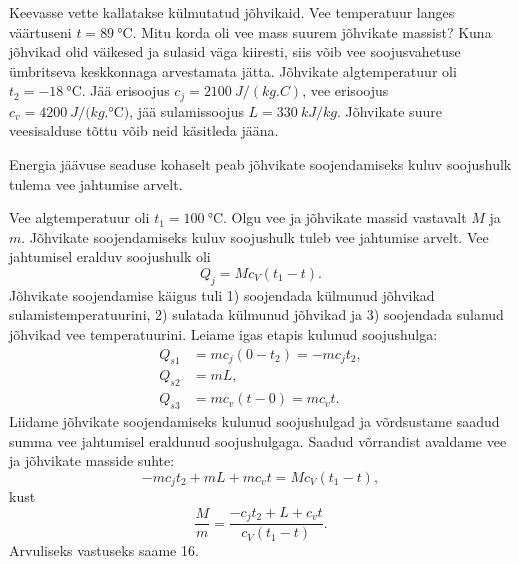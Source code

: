 
Keevasse vette kallatakse külmutatud jõhvikaid. Vee temperatuur langes väärtuseni $t=\SI{89}{\degreeCelsius}$.
Mitu korda oli vee mass suurem jõhvikate massist? Kuna jõhvikad olid väikesed ja sulasid väga kiiresti, siis
võib vee soojusvahetuse ümbritseva keskkonnaga arvestamata jätta. Jõhvikate algtemperatuur oli
$t_2=\SI{-18}{\degreeCelsius}$. Jää erisoojus $c_j=\SI{2100}{J/(kg.C)}$, vee erisoojus $c_v=\SI{4200}{J/(kg.\degreeCelsius)}$, jää sulamissoojus $L=\SI{330}{kJ/kg}$. Jõhvikate suure veesisalduse tõttu võib neid käsitleda jääna.

\hint
Energia jäävuse seaduse kohaselt peab jõhvikate soojendamiseks kuluv soojushulk tulema vee jahtumise arvelt.

\solu
Vee algtemperatuur oli $t_1=\SI{100}{\degreeCelsius}$. Olgu vee ja jõhvikate massid vastavalt $M$ ja $m$. Jõhvikate soojendamiseks kuluv soojushulk tuleb vee jahtumise arvelt. Vee jahtumisel eralduv soojushulk oli
\[
Q_j=Mc_V(t_1-t).
\]
Jõhvikate soojendamise käigus tuli 1) soojendada külmunud jõhvikad sulamistemperatuurini, 2) sulatada külmunud jõhvikad ja 3) soojendada sulanud jõhvikad vee temperatuurini.
Leiame igas etapis kulunud soojushulga:
\[
\begin{aligned}
Q_{s1}&=mc_j(0-t_2)=-mc_jt_2,\\
Q_{s2}&=mL,\\
Q_{s3}&=mc_v(t-0)=mc_vt.
\end{aligned}
\]
Liidame jõhvikate soojendamiseks kulunud soojushulgad ja võrdsustame saadud summa vee jahtumisel eraldunud soojushulgaga. Saadud võrrandist avaldame vee ja jõhvikate masside suhte:
\[
-mc_jt_2+mL+mc_vt=Mc_V(t_1-t),
\]
kust
\[
\frac{M}{m}=\frac{-c_jt_2+L+c_vt}{c_V(t_1-t)}.
\]
Arvuliseks vastuseks saame \num{16}.
\probend